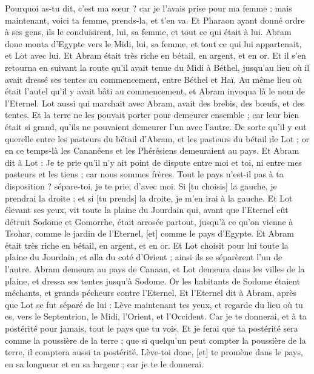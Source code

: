 \begin{multicols}{2}
Pourquoi as-tu dit, c'est ma sœur ? car je l'avais prise pour ma femme ; mais maintenant, voici ta femme, prends-la, et t'en va.
Et Pharaon ayant donné ordre à ses gens, ils le conduisirent, lui, sa femme, et tout ce qui était à lui.
\VerseOne{}Abram donc monta d'Egypte vers le Midi, lui, sa femme, et tout ce qui lui appartenait, et Lot avec lui.
Et Abram était très riche en bétail, en argent, et en or.
Et il s'en retourna en suivant la route qu'il avait tenue du Midi à Béthel, jusqu'au lieu où il avait dressé ses tentes au commencement, entre Béthel et Haï,
Au même lieu où était l'autel qu'il y avait bâti au commencement, et Abram invoqua là le nom de l'Eternel.
Lot aussi qui marchait avec Abram, avait des brebis, des bœufs, et des tentes.
Et la terre ne les pouvait porter pour demeurer ensemble ; car leur bien était si grand, qu'ils ne pouvaient demeurer l'un avec l'autre.
De sorte qu'il y eut querelle entre les pasteurs du bétail d'Abram, et les pasteurs du bétail de Lot ; or en ce temps-là les Cananéens et les Phérésiens demeuraient au pays.
Et Abram dit à Lot : Je te prie qu'il n'y ait point de dispute entre moi et toi, ni entre mes pasteurs et les tiens ; car nous sommes frères.
Tout le pays n'est-il pas à ta disposition ? sépare-toi, je te prie, d'avec moi. Si [tu choisis] la gauche, je prendrai la droite ; et si [tu prends] la droite, je m'en irai à la gauche.
Et Lot élevant ses yeux, vit toute la plaine du Jourdain qui, avant que l'Eternel eût détruit Sodome et Gomorrhe, était arrosée partout, jusqu'à ce qu'on vienne à Tsohar, comme le jardin de l'Eternel, [et] comme le pays d'Egypte.
Et Abram était très riche en bétail, en argent, et en or.
Et Lot choisit pour lui toute la plaine du Jourdain, et alla du coté d'Orient ; ainsi ils se séparèrent l'un de l'autre.
Abram demeura au pays de Canaan, et Lot demeura dans les villes de la plaine, et dressa ses tentes jusqu'à Sodome.
Or les habitants de Sodome étaient méchants, et grands pécheurs contre l'Eternel.
Et l'Eternel dit à Abram, après que Lot se fut séparé de lui : Lève maintenant tes yeux, et regarde du lieu où tu es, vers le Septentrion, le Midi, l'Orient, et l'Occident. Car je te donnerai, et à ta postérité pour jamais, tout le pays que tu vois.
Et je ferai que ta postérité sera comme la poussière de la terre ; que si quelqu'un peut compter la poussière de la terre, il comptera aussi ta postérité.
Lève-toi donc, [et] te promène dans le pays, en sa longueur et en sa largeur ; car je te le donnerai.

\end{multicols}

